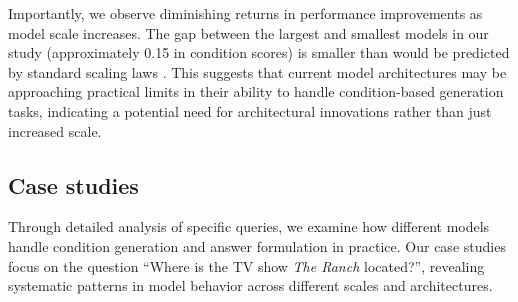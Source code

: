 Importantly, we observe diminishing returns in performance improvements as model scale increases. The gap between the largest and smallest models in our study (approximately 0.15 in condition scores) is smaller than would be predicted by standard scaling laws \cite{kaplan2020scaling}. This suggests that current model architectures may be approaching practical limits in their ability to handle condition-based generation tasks, indicating a potential need for architectural innovations rather than just increased scale.

\subsection{Case studies}

Through detailed analysis of specific queries, we examine how different models handle condition generation and answer formulation in practice. Our case studies focus on the question ``Where is the TV show \textit{The Ranch} located?'', revealing systematic patterns in model behavior across different scales and architectures.

